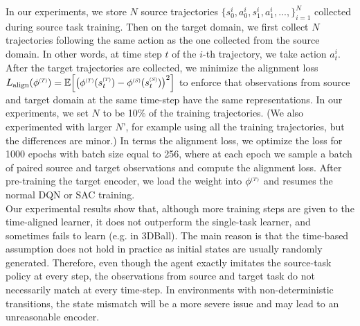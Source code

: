 \begin{itemize}
    In our experiments, we store $N$ source trajectories $\Big\{s^{i}_0,a^{i}_0,s^{i}_{1}, a^{i}_{1},...,\Big\}_{i=1}^{N}$ collected during source task training. Then on the target domain, we first collect $N$ trajectories following the same action as the one collected from the source domain. In other words, at time step $t$ of the $i$-th trajectory, we take action $a_{t}^i$. %
    After the target trajectories are collected, we minimize the alignment loss $L_{\text{align}}(\phi\target)=\mathbb{E}\Big[\big(\phi\target(s\target_t)-\phi\source(s\source_t)\big)^2\Big]$ to enforce that observations from source and target domain at the same time-step have the same representations.\newline
    In our experiments, we set $N$ to be 10\% of the training trajectories. (We also experimented with larger $N$', for example using all the training trajectories, but the differences are minor.) In terms the alignment loss, we optimize the loss for 1000 epochs with batch size equal to 256, where at each epoch we sample a batch of paired source and target observations and compute the alignment loss. After pre-training the target encoder, we load the weight into $\phi\target$ and resumes the normal DQN or SAC training. \\
    Our experimental results show that, although more training steps are given to the time-aligned learner, it does not outperform the single-task learner, and sometimes fails to learn (e.g. in 3DBall). The main reason is that the time-based assumption does not hold in practice as initial states are usually randomly generated. 
    Therefore, even though the agent exactly imitates the source-task policy at every step, 
    the observations from source and target task do not necessarily match at every time-step. 
    In environments with non-deterministic transitions, the state mismatch will be a more severe issue and may lead to an unreasonable encoder.
\end{itemize}

